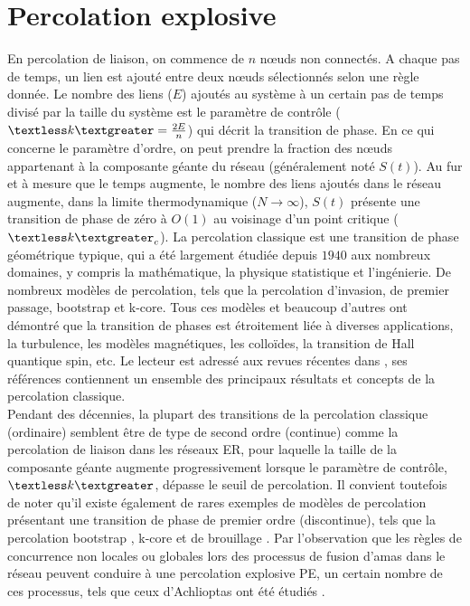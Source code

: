 \section{Percolation explosive}
En percolation de liaison, on commence de $n$ nœuds non connectés. A chaque pas de temps, un lien est ajouté entre deux nœuds sélectionnés selon une règle donnée. Le nombre des liens ($E$) ajoutés au système à un certain pas de temps divisé par la taille du système est le paramètre de contrôle ($\km=\frac{2E}{n}$) qui décrit la transition de phase. En ce qui concerne le paramètre d'ordre, on peut prendre la fraction des nœuds appartenant à la composante géante du réseau (généralement noté $S(t)$). Au fur et à mesure que le temps augmente, le nombre des liens ajoutés dans le réseau augmente, dans la limite thermodynamique ($N\longrightarrow \infty$), $S(t)$ présente une transition de phase de zéro à $O(1)$ au voisinage d'un point critique ($\km_c$). La percolation classique est une transition de phase géométrique typique, qui a été largement étudiée depuis $1940$ aux nombreux domaines, y compris la mathématique, la physique statistique et l'ingénierie. De nombreux modèles de percolation, tels que la percolation d'invasion, de premier passage,  bootstrap et k-core. 
Tous ces modèles et beaucoup d'autres ont démontré que la transition de phases est étroitement liée à diverses applications, la turbulence, les modèles magnétiques, les colloïdes, la transition de Hall quantique spin, etc. Le lecteur est adressé aux revues récentes dans \cite{Boccaletti-al2016,Souza-Nagler2015,Araujo-al2014}, ses références contiennent un ensemble des principaux résultats et concepts de la percolation classique.\\

Pendant des décennies, la plupart des transitions de la percolation classique (ordinaire) semblent être de type de second ordre (continue) comme la percolation de liaison dans les réseaux ER, pour laquelle la taille de la composante géante augmente progressivement lorsque le paramètre de contrôle, $\km$, dépasse le seuil de percolation. Il convient toutefois de noter qu'il existe également de rares exemples de modèles de percolation présentant une transition de phase de premier ordre (discontinue), tels que la percolation bootstrap \cite{Adler1991}, k-core \cite{Dorogovtsev2-2006} et de brouillage \cite{Echenique-al2005}. Par l'observation que les règles de concurrence non locales ou globales lors des processus de fusion d'amas dans le réseau peuvent conduire à une percolation explosive PE, un certain nombre de ces processus, tels que ceux d'Achlioptas ont été étudiés \cite{Costa-al2010,Costa-al2015,Cho-Kahng2011}.

